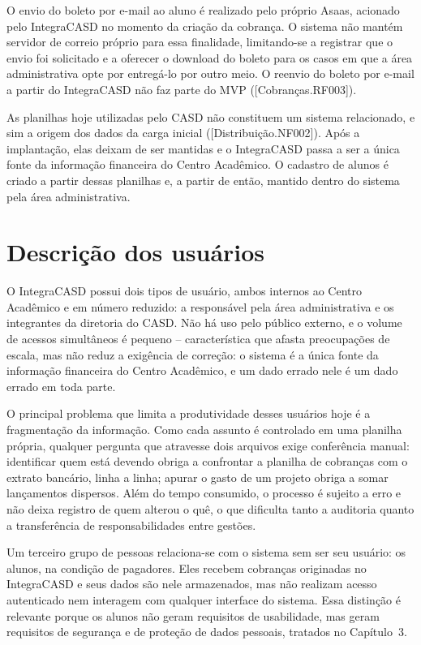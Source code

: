 \documentclass[11pt,a4paper,oneside]{report}
\begin{document}
O envio do boleto por e-mail ao aluno é realizado pelo próprio Asaas, acionado pelo IntegraCASD no
momento da criação da cobrança. O sistema não mantém servidor de correio próprio para essa
finalidade, limitando-se a registrar que o envio foi solicitado e a oferecer o download do boleto
para os casos em que a área administrativa opte por entregá-lo por outro meio. O reenvio do boleto
por e-mail a partir do IntegraCASD não faz parte do MVP ([Cobranças.RF003]).

As planilhas hoje utilizadas pelo CASD não constituem um sistema relacionado, e sim a origem dos
dados da carga inicial ([Distribuição.NF002]). Após a implantação, elas deixam de ser mantidas e o
IntegraCASD passa a ser a única fonte da informação financeira do Centro Acadêmico. O cadastro de
alunos é criado a partir dessas planilhas e, a partir de então, mantido dentro do sistema pela área
administrativa.

\section{Descrição dos usuários}

O IntegraCASD possui dois tipos de usuário, ambos internos ao Centro Acadêmico e em número
reduzido: a responsável pela área administrativa e os integrantes da diretoria do CASD. Não há uso
pelo público externo, e o volume de acessos simultâneos é pequeno -- característica que afasta
preocupações de escala, mas não reduz a exigência de correção: o sistema é a única fonte da
informação financeira do Centro Acadêmico, e um dado errado nele é um dado errado em toda parte.

O principal problema que limita a produtividade desses usuários hoje é a fragmentação da
informação. Como cada assunto é controlado em uma planilha própria, qualquer pergunta que atravesse
dois arquivos exige conferência manual: identificar quem está devendo obriga a confrontar a
planilha de cobranças com o extrato bancário, linha a linha; apurar o gasto de um projeto obriga a
somar lançamentos dispersos. Além do tempo consumido, o processo é sujeito a erro e não deixa
registro de quem alterou o quê, o que dificulta tanto a auditoria quanto a transferência de
responsabilidades entre gestões.

Um terceiro grupo de pessoas relaciona-se com o sistema sem ser seu usuário: os alunos, na condição
de pagadores. Eles recebem cobranças originadas no IntegraCASD e seus dados são nele armazenados,
mas não realizam acesso autenticado nem interagem com qualquer interface do sistema. Essa distinção
é relevante porque os alunos não geram requisitos de usabilidade, mas geram requisitos de segurança
e de proteção de dados pessoais, tratados no Capítulo~3.
\end{document}
